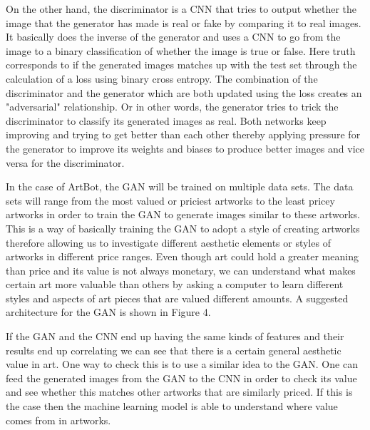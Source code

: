 \documentclass{article}
\begin{document}
On the other hand, the discriminator is a CNN that tries to output whether the image that the generator has made is real or fake by comparing it to real images. It basically does the inverse of the generator and uses a CNN to go from the image to a binary classification of whether the image is true or false. Here truth corresponds to if the generated images matches up with the test set through the calculation of a loss using binary cross entropy. The combination of the discriminator and the generator which are both updated using the loss creates an "adversarial" relationship. Or in other words, the generator tries to trick the discriminator to classify its generated images as real. Both networks keep improving and trying to get better than each other thereby applying pressure for the generator to improve its weights and biases to produce better images and vice versa for the discriminator. \newline 

In the case of ArtBot, the GAN will be trained on multiple data sets. The data sets will range from the most valued or priciest artworks to the least pricey artworks in order to train the GAN to generate images similar to these artworks. This is a way of basically training the GAN to adopt a style of creating artworks therefore allowing us to investigate different aesthetic elements or styles of artworks in different price ranges.  Even though art could hold a greater meaning than price and its value is not always monetary, we can understand what makes certain art more valuable than others by asking a computer to learn different styles and aspects of art pieces that are valued different amounts. A suggested architecture for the GAN is shown in Figure 4. \newline  

If the GAN and the CNN end up having the same kinds of features and their results end up correlating we can see that there is a certain general aesthetic value in art. One way to check this is to use a similar idea to the GAN. One can feed the generated images from the GAN to the CNN in order to check its value and see whether this matches other artworks that are similarly priced. If this is the case then the machine learning model is able to understand where value comes from in artworks. \newline

\end{document}
